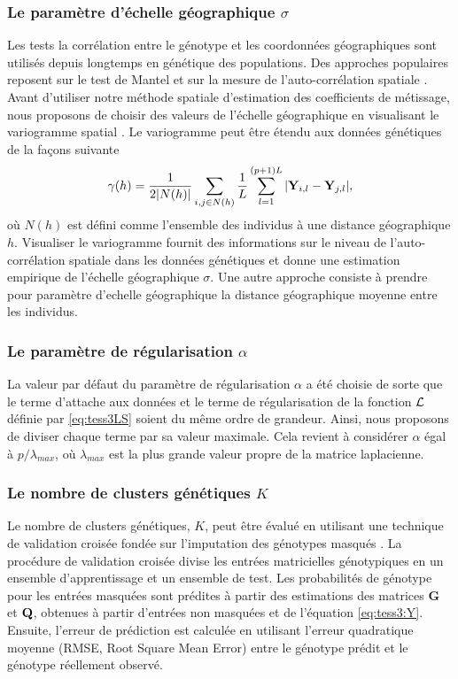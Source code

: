 \documentclass[12pt,a4paper,twoside]{ugathesis}
\begin{document}
\subsubsection{Le paramètre d'échelle géographique \(\sigma\)}
\label{sec:org7726351}
Les tests la corrélation entre le génotype et les coordonnées géographiques sont
utilisés depuis longtemps en génétique des populations. Des approches populaires
reposent sur le test de Mantel \citep{mantel1967} et sur la mesure de
l'auto-corrélation spatiale \citep{HARDY_1999,Epperson_1996}. Avant d'utiliser
notre méthode spatiale d'estimation des coefficients de métissage, nous
proposons de choisir des valeurs de l'échelle géographique en visualisant le
variogramme spatial \citep{Cressie1993}. Le variogramme peut être étendu aux
données génétiques de la façons suivante
\begin{equation}
\label{eq:tess3:variogram}
\gamma(h) = \frac{1}{2 |N(h)|} \sum_{i,j \in N(h)} \frac{1}{L} \sum_{l = 1}^{(p+1)L} |\mathbf{Y}_{i,l} - \mathbf{Y}_{j,l}|,
\end{equation}
où \(N(h)\) est défini comme l'ensemble des individus à une distance géographique
\(h\). Visualiser le variogramme fournit des informations sur le niveau de
l'auto-corrélation spatiale dans les données génétiques et donne une estimation
empirique de l'échelle géographique \(\sigma\). Une autre approche consiste à
prendre pour paramètre d'echelle géographique la distance géographique moyenne
entre les individus.

\subsubsection{Le paramètre de régularisation \(\alpha\)}
\label{sec:orgea0d691}
La valeur par défaut du paramètre de régularisation \(\alpha\) a été choisie de
sorte que le terme d'attache aux données et le terme de régularisation de la
fonction \(\mathcal{L}\) définie par \eqref{eq:tess3LS} soient du même ordre de grandeur.
Ainsi, nous proposons de diviser chaque terme par sa valeur maximale. Cela
revient à considérer \(\alpha\) égal à \(p / \lambda_{max}\), où \(\lambda_{max}\) est
la plus grande valeur propre de la matrice laplacienne.

\subsubsection{Le nombre de clusters génétiques \(K\)}
\label{sec:org5ce0c42}

Le nombre de clusters génétiques, \(K\), peut être évalué en utilisant une
technique de validation croisée fondée sur l'imputation des génotypes masqués
\citep{Wold_1978,Eastment_1982,Alexander_2011,Frichot_2014}. La procédure de
validation croisée divise les entrées matricielles génotypiques en un ensemble
d'apprentissage et un ensemble de test. Les probabilités de génotype pour les
entrées masquées sont prédites à partir des estimations des matrices \(\mathbf{G}\) et
\(\mathbf{Q}\), obtenues à partir d'entrées non masquées et de l'équation \eqref{eq:tess3:Y}.
Ensuite, l'erreur de prédiction est calculée en utilisant l'erreur quadratique
moyenne (RMSE, Root Square Mean Error) entre le génotype prédit et le génotype
réellement observé.
\end{document}
